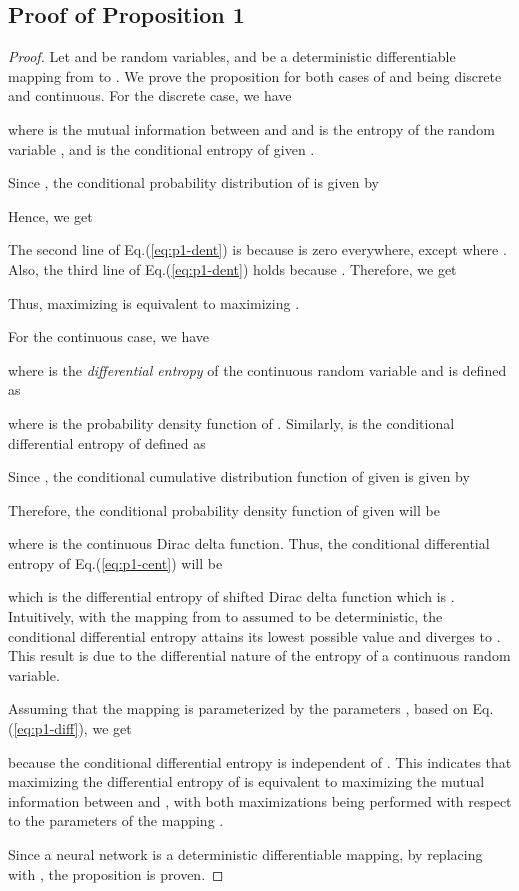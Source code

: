 \documentclass{article}
\begin{document}
\subsection{Proof of Proposition 1}
\begin{proof}
	Let  and  be random variables, and  be a deterministic differentiable mapping from  to . We prove the proposition for both cases of  and  being discrete and continuous. For the discrete case, we have
	
	where  is the mutual information between  and  and  is the entropy of the random variable , and  is the conditional entropy of  given .
	
	Since , the conditional probability distribution of  is given by
	
	Hence, we get
	
	The second line of Eq.(\ref{eq:p1-dent}) is because  is zero everywhere, except where . Also, the third line of Eq.(\ref{eq:p1-dent}) holds because . Therefore, we get
	
	Thus, maximizing  is equivalent to maximizing .
	
	For the continuous case, we have
	
	where  is the \textit{differential entropy} of the continuous random variable  and is defined as
	
	where  is the probability density function of . Similarly,  is the conditional differential entropy of  defined as
	
	Since , the conditional cumulative distribution function of  given  is given by
	
	Therefore, the conditional probability density function of  given  will be
	
	where  is the continuous Dirac delta function. Thus, the conditional differential entropy of Eq.(\ref{eq:p1-cent}) will be
	
	which is the differential entropy of shifted Dirac delta function which is . Intuitively, with the mapping from  to  assumed to be deterministic, the conditional differential entropy  attains its lowest possible value and diverges to . This result is due to the differential nature of the entropy of a continuous random variable.
	
	Assuming that the mapping  is parameterized by the parameters , based on Eq.(\ref{eq:p1-diff}), we get
	
	because the conditional differential entropy  is independent of . This indicates that maximizing the differential entropy of  is equivalent to maximizing the mutual information between  and , with both maximizations being performed with respect to the parameters  of the mapping \cite{haykin, infomax}.
	
	Since a neural network is a deterministic differentiable mapping, by replacing  with , the proposition is proven.
\end{proof}
\end{document}
